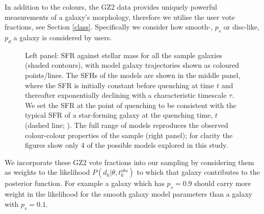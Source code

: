\documentclass{mn2e}
\begin{document}
In addition to the colours, the GZ2 data provides uniquely powerful measurements of a galaxy's morphology, therefore we utilise the user vote fractions, see Section \ref{class}. Specifically we consider how smooth-, $p_s$ or disc-like, $p_d$ a galaxy is considered by users. %

\begin{figure*}
\caption{Left panel: SFR against stellar mass for all the sample galaxies (shaded contours), with model galaxy trajectories shown as coloured points/lines. The SFHs of the models are shown in the middle panel, where the SFR is initially constant before quenching at time $t$ and thereafter exponentially declining with a characteristic timescale $\tau$. We set the SFR at the point of quenching to be consistent with the typical SFR of a star-forming galaxy at the quenching time, $t$ (dashed line; \citealt{Peng}). The full range of models reproduces the observed colour-colour properties of the sample (right panel); for clarity the figures show only 4 of the possible models explored in this study.}
\label{sfr_mass_col}
\end{figure*}

We incorporate these GZ2 vote fractions  into our sampling by considering them as weights to the likelihood $P(d_{k}|\theta, t^{obs}_{k})$ to which that galaxy contributes to the posterior function. For example a galaxy which has $p_{s} = 0.9$ should carry more weight in the likelihood for the smooth galaxy model parameters than a galaxy with $p_{s} = 0.1$. 

%
\end{document}
